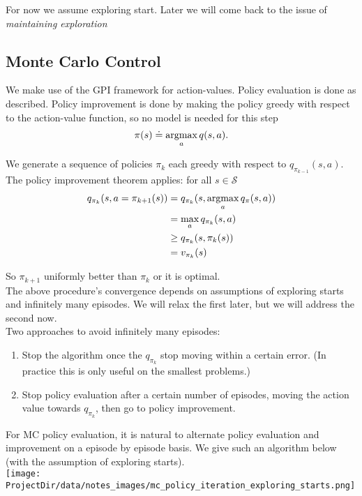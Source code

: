 For now we assume exploring start. Later we will come back to the issue of \emph{maintaining exploration}

\subsection{Monte Carlo Control}
We make use of the GPI framework for action-values. Policy evaluation is done as described. Policy improvement is done by making the policy greedy with respect to the action-value function, so no model is needed for this step
\[
    \pi(s) \doteq \operatorname*{argmax}_a q(s, a).
\]

We generate a sequence of policies $\pi_k$ each greedy with respect to $q_{\pi_{k-1}}(s, a)$. The policy improvement theorem applies: for all $s \in \mathcal{S}$
\begin{align*}
    q_{\pi_k}(s, a=\pi_{k+1}(s)) &= q_{\pi_k}(s, \operatorname*{argmax}_a q_\pi(s, a)) \\
                    &= \max_a q_{\pi_k}(s, a) \\
                    &\geq q_{\pi_k}(s, \pi_k(s))\\
                    &= v_{\pi_k}(s)
\end{align*}

So $\pi_{k+1}$ uniformly better than $\pi_k$ or it is optimal. \\

The above procedure's convergence depends on assumptions of exploring starts and infinitely many episodes. We will relax the first later, but we will address the second now.\\

Two approaches to avoid infinitely many episodes:
\begin{enumerate}
    \item Stop the algorithm once the $q_{\pi_k}$ stop moving within a certain error. (In practice this is only useful on the smallest problems.)
    \item Stop policy evaluation after a certain number of episodes, moving the action value towards $q_{\pi_k}$, then go to policy improvement.
\end{enumerate}

For MC policy evaluation, it is natural to alternate policy evaluation and improvement on a episode by episode basis. We give such an algorithm below (with the assumption of exploring starts).\\

\texttt{[image: \\ProjectDir/data/notes\_images/mc\_policy\_iteration\_exploring\_starts.png]}\\

